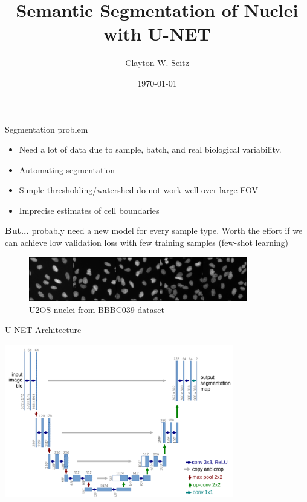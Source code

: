 \documentclass[aspectratio=1610]{beamer}					%
\title{Semantic Segmentation of Nuclei with U-NET}	%
\author{Clayton W. Seitz}								%
\date{\today}									%
\begin{document}
\begin{frame}
  \titlepage
\end{frame}

\begin{frame}{Segmentation problem}

\begin{itemize}
\item Need a lot of data due to sample, batch, and real biological variability. 
\item Automating segmentation
\item Simple thresholding/watershed do not work well over large FOV
\item Imprecise estimates of cell boundaries\\
\end{itemize}

\vspace{0.1in}

\textbf{But...} probably need a new model for every sample type. Worth the effort if we can achieve low validation loss with few training samples (few-shot learning)\\

\begin{center}
\begin{figure}
\includegraphics[width=0.85\textwidth]{input-train.png}
\caption{U2OS nuclei from BBBC039 dataset}
\end{figure}
\end{center}

\end{frame}

\begin{frame}{U-NET Architecture}

\begin{center}
\includegraphics[width=0.75\textwidth]{unet.png}
\end{center}
\end{frame}
\end{document}
